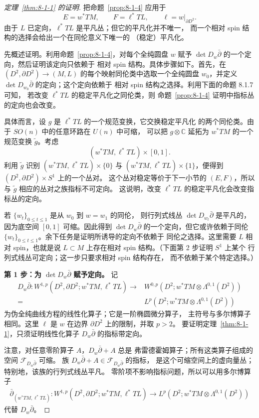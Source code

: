 \begin{proof}[定理~\ref{thm:8-1-1} 的证明]
把命题~\ref{prop:8-1-4} 应用于
\[
E=w^*TM,
\qquad
F=\ell^*TL,
\qquad
\ell=w|_{\partial D^2}.
\]
由于 $L$ 已定向，$\ell^*TL$ 是平凡丛；但它的平凡化并不唯一，
而一个相对 spin 结构的选择会给出一个在同伦意义下唯一的
（稳定）平凡化。

先概述证明。利用命题~\ref{prop:8-1-4}，对每个全纯圆盘 $w$
赋予 $\det D_w\bar\partial$ 的一个定向，然后证明该定向只依赖于
相对 spin 结构。具体步骤如下。首先，在
$(D^2,\partial D^2)\to(M,L)$ 的每个映射同伦类中选取一个全纯圆盘
$w_0$，并定义 $\det D_{w_0}\bar\partial$ 的定向；这个定向依赖于
相对 spin 结构之选择。利用下面的命题 8.1.7 可知，
若改变 $\ell^*TL$ 的稳定平凡化之同伦类，则
命题~\ref{prop:8-1-4} 证明中指标丛的定向也会改变。

具体而言，设 $g$ 是 $\ell^*TL$ 的一个规范变换，它交换稳定平凡化
的两个同伦类。由于 $SO(n)$ 中的任意环路在 $U(n)$ 中可缩，
可以把 $g\otimes\mathbb C$ 延拓为 $w^*TM$ 的一个规范变换
$\widetilde g$。考虑
\[
(w^*TM,\ell^*TL)\times[0,1].
\]
利用 $\widetilde g$ 识别
$(w^*TM,\ell^*TL)\times\{0\}$ 与
$(w^*TM,\ell^*TL)\times\{1\}$，便得到
$(D^2,\partial D^2)\times S^1$ 上的一个丛对。
这个丛对稳定等价于下一小节的 $(E,F)$，所以与
$\widetilde g$ 相应的丛对之族指标不可定向。
这说明，改变 $\ell^*TL$ 的稳定平凡化会改变指标丛的定向。

若 $\{w_t\}_{0\leq t\leq1}$ 是从 $w_0$ 到 $w=w_1$ 的同伦，
则行列式线丛 $\det D_{w_t}\bar\partial$ 是平凡的，
因为底空间 $[0,1]$ 可缩。因此得到
$\det D_w\bar\partial$ 的一个定向，但它或许依赖于同伦
$\{w_t\}_{0\leq t\leq1}$。余下任务是证明所诱导的定向不依赖于
同伦之选择。这里需要 $L$ 相对 spin，也就是说
$L\subset M$ 上存在相对 spin 结构。（下面第 2 步证明 $S^1$ 上某个
行列式线丛可定向；这一步只要求相对 spin 结构存在，
而不依赖于某个特定选择。）

\medskip
\noindent\textbf{第 1 步：为 $\det D_w\bar\partial$ 赋予定向。}
记
\[
\begin{split}
D_w\bar\partial\colon
W^{1,p}(D^2,\partial D^2;w^*TM,\ell^*TL)
\longrightarrow{}&W^{0,p}(D^2;w^*TM\otimes\Lambda^{0,1}(D^2))\\
={}&L^p(D^2;w^*TM\otimes\Lambda^{0,1}(D^2))
\end{split}
\]
为伪全纯曲线方程的线性化算子；它是一阶椭圆微分算子，
主符号与多尔博算子相同。这里 $\ell$ 是 $w$ 在边界
$\partial D^2$ 上的限制，并取 $p>2$。
要证明定理~\ref{thm:8-1-1}，只须证明线性化算子
$D_w\bar\partial$ 的指标带定向。

注意，对任意零阶算子 $A$，$D_w\bar\partial+A$ 总是
弗雷德霍姆算子；所有这类算子组成的空间
$\mathcal F_{D_w\bar\partial}$ 可缩。
族 $D_w\bar\partial+A\in\mathcal F_{D_w\bar\partial}$ 的指标，
是这个可缩空间上的虚向量丛；特别地，该族的行列式线丛平凡。
零阶项不影响指标问题，所以可以用多尔博算子
\[
\begin{split}
\bar\partial_{(w^*TM,\ell^*TL)}\colon
W^{1,p}(D^2,\partial D^2;w^*TM,\ell^*TL)
\longrightarrow L^p(D^2;w^*TM\otimes\Lambda^{0,1}(D^2))
\end{split}
\]
代替 $D_w\bar\partial$。


\end{proof}
